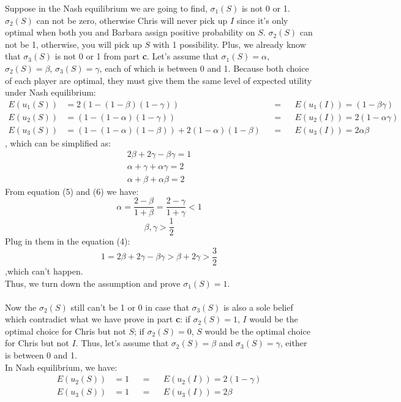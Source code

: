 \documentclass{article}
\begin{document}
\begin{description}
    Suppose in the Nash equilibrium we are going to find, $\sigma _1(S)$ is not 0 or 1. $\sigma _2(S)$ can not be zero, otherwise Chris will never pick up $I$ since it's only optimal when both you and Barbara assign positive probability on $S$. $\sigma _2(S)$ can not be 1, otherwise, you will pick up $S$ with 1 possibility. Plus, we already know that $\sigma _3(S)$ is not 0 or 1 from part {\bf c}. Let's assume that $\sigma _1(S)=\alpha$, $\sigma _2(S)=\beta$, $\sigma _3(S)=\gamma$, each of which is between 0 and 1. Because both choice of each player are optimal, they must give them the same level of expected utility under Nash equilibrium:
    \begin{align}
      E(u_1(S))&=2(1-(1-\beta )(1-\gamma ))&&=&&E(u_1(I))=(1-\beta \gamma )\\
      E(u_2(S))&=(1-(1-\alpha )(1-\gamma ))&&=&&E(u_2(I))=2(1-\alpha \gamma )\\
      E(u_3(S))&=(1-(1-\alpha )(1-\beta ))+2(1-\alpha )(1-\beta )&&=&&E(u_3(I))=2\alpha \beta
    \end{align}
    , which can be simplified as:
    \begin{align}
      2\beta +2\gamma -\beta \gamma =1\\
      \alpha +\gamma +\alpha \gamma =2\\
      \alpha +\beta +\alpha \beta =2
    \end{align}
    From equation (5) and (6) we have: $$\alpha =\frac{2-\beta }{1+\beta }=\frac{2-\gamma }{1+\gamma }<1$$
    $$\beta ,\gamma >\frac{1}{2}$$
    Plug in them in the equation (4):   $$1=2\beta +2\gamma -\beta \gamma>\beta +2\gamma >\frac{3}{2}$$
    ,which can't happen.\\
    Thus, we turn down the assumption and prove $\sigma _1(S)=1$.\\\\
    Now the $\sigma _2(S)$ still can't be 1 or 0 in case that $\sigma _3(S)$ is also a sole belief which contradict what we have prove in part {\bf c}: if $\sigma _2(S)=1$, $I$ would be the optimal choice for Chris but not $S$; if $\sigma _2(S)=0$, $S$ would be the optimal choice for Chris but not $I$. Thus, let's assume that $\sigma _2(S)=\beta$ and $\sigma _3(S)=\gamma$, either is between 0 and 1.\\
    In Nash equilibrium, we have:
    \begin{align}
      E(u_2(S))&=1&&=&&E(u_2(I))=2(1-\gamma )\\
      E(u_3(S))&=1&&=&&E(u_3(I))=2\beta
    \end{align}

\end{description}
\end{document}
